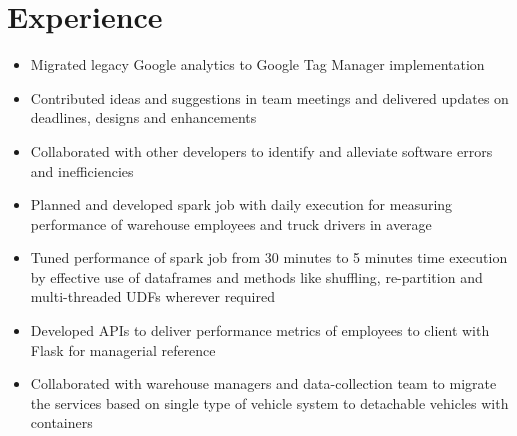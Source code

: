 \documentclass[]{deedy-resume-openfont}
\begin{document}
\hfill
\begin{minipage}[t]{0.66\textwidth} 


\section{Experience}
\vspace{\topsep}
\begin{itemize}
\item Migrated legacy Google analytics to Google Tag Manager implementation
\item Contributed ideas and suggestions in team meetings and delivered updates on deadlines, designs and enhancements
\end{itemize}
\sectionsep

\vspace{\topsep} %
\begin{itemize}
\item Collaborated with other developers to identify and alleviate software errors and inefficiencies
\item Planned and developed spark job with daily execution for measuring performance of warehouse employees and truck drivers in average
\item Tuned performance of spark job from 30 minutes to 5 minutes time execution by effective use of dataframes and methods like shuffling, re-partition and multi-threaded UDFs wherever required
\item Developed APIs to deliver performance metrics of employees to client with Flask for managerial reference
\item Collaborated with warehouse managers and data-collection team to migrate the services based on single type of vehicle system to detachable vehicles with containers
\end{itemize}
\sectionsep


\end{minipage}
\end{document}

